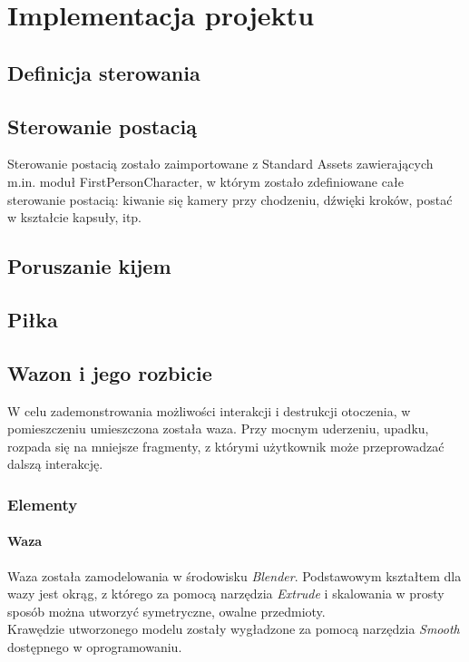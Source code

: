 \section{Implementacja projektu}

\subsection{Definicja sterowania}

\subsection{Sterowanie postacią}
Sterowanie postacią zostało zaimportowane z Standard Assets zawierających m.in. moduł FirstPersonCharacter, w którym zostało zdefiniowane całe sterowanie postacią: kiwanie się kamery przy chodzeniu, dźwięki kroków, postać w kształcie kapsuły, itp.

\subsection{Poruszanie kijem}

\subsection{Piłka}

\subsection{Wazon i jego rozbicie}
W celu zademonstrowania możliwości interakcji i destrukcji otoczenia, w pomieszczeniu umieszczona została waza. Przy mocnym uderzeniu, upadku, rozpada się na mniejsze fragmenty, z którymi użytkownik może przeprowadzać dalszą interakcję.

\subsubsection{Elementy}
\paragraph{Waza}
Waza została zamodelowania w środowisku \textit{Blender}. Podstawowym kształtem dla wazy jest okrąg, z którego za pomocą narzędzia \textit{Extrude} i skalowania w prosty sposób można utworzyć symetryczne, owalne przedmioty. \\
Krawędzie utworzonego modelu zostały wygładzone za pomocą narzędzia \textit{Smooth} dostępnego w oprogramowaniu. 
